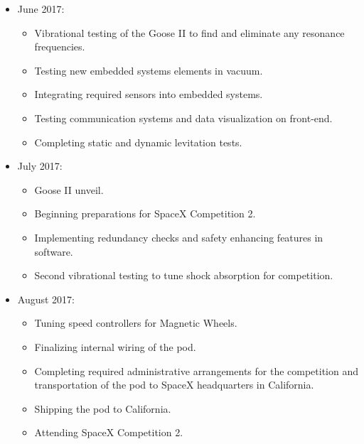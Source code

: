 \documentclass[main.tex]{subfiles}
\begin{document}
\begin{itemize}
\item June 2017:
\begin{itemize}
    \item Vibrational testing of the Goose II to find and eliminate any resonance frequencies.
    \item Testing new embedded systems elements in vacuum.
    \item Integrating required sensors into embedded systems.
    \item Testing communication systems and data visualization on front-end.
    \item Completing static and dynamic levitation tests.
\end{itemize}

\item July 2017:
\begin{itemize}
    \item Goose II unveil.
    \item Beginning preparations for SpaceX Competition 2.
    \item Implementing redundancy checks and safety enhancing features in software.
    \item Second vibrational testing to tune shock absorption for competition.
\end{itemize}

\item August 2017:
\begin{itemize}
    \item Tuning speed controllers for Magnetic Wheels.
    \item Finalizing internal wiring of the pod.
    \item Completing required administrative arrangements for the competition and transportation of the pod to SpaceX headquarters in California.
    \item Shipping the pod to California.
    \item Attending SpaceX Competition 2.
\end{itemize}

\end{itemize}
\end{document}
